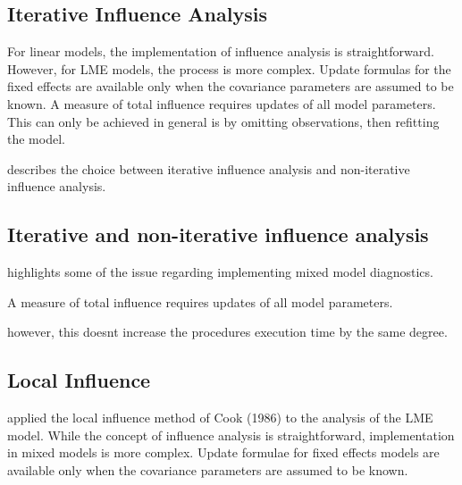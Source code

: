 \documentclass[Main.tex]{subfiles}
\begin{document}
		
		
				\subsection{Iterative Influence Analysis}
				
				For linear models, the implementation of influence analysis is straightforward.
				However, for LME models, the process is more complex. Update formulas for the fixed effects are available only when the covariance parameters are assumed to be known. A measure of total influence requires updates of all model parameters.
				This can only be achieved in general is by omitting observations, then refitting the model.
				
				\citet{schabenberger} describes the choice between  iterative influence analysis and  non-iterative influence analysis.
				

	

\subsection{Iterative and non-iterative influence analysis} %
\citet{schabenberger} highlights some of the issue regarding implementing mixed model diagnostics.


A measure of total influence requires updates of all model parameters.


however, this doesnt increase the procedures execution time by the same degree.

\newpage




			
				

		
		


		
	
		\subsection{Local Influence}
		\citet{Beckman} applied the local influence method of Cook (1986) to the analysis of the LME model.
		While the concept of influence analysis is straightforward, implementation in mixed models is more complex. Update formulae for fixed effects models are available only when the covariance parameters are assumed to be known.
		
\end{document}
